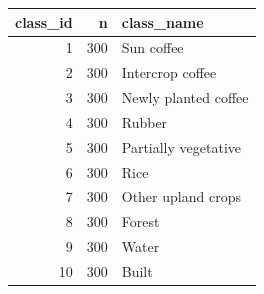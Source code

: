 \begin{tabular}{rrl}
\toprule
class_id & n & class_name \\
\midrule
1 & 300 & Sun coffee \\
2 & 300 & Intercrop coffee \\
3 & 300 & Newly planted coffee \\
4 & 300 & Rubber \\
5 & 300 & Partially vegetative \\
6 & 300 & Rice \\
7 & 300 & Other upland crops \\
8 & 300 & Forest \\
9 & 300 & Water \\
10 & 300 & Built \\
\bottomrule
\end{tabular}
